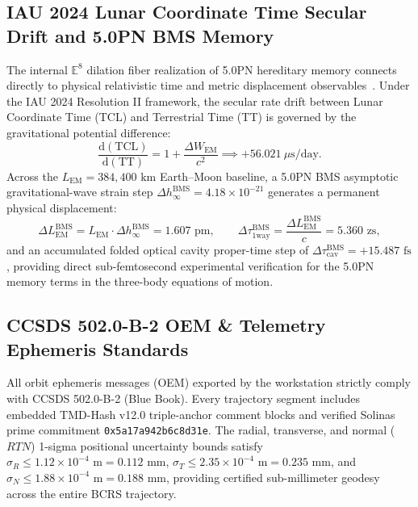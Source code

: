 \documentclass[11pt,a4paper,reqno]{article}
\theoremstyle{plain}
\theoremstyle{definition}
\theoremstyle{remark}
\numberwithin{equation}{section}
\providecommand{\diff}{\mathrm{d}}
\begin{document}
\subsection{IAU 2024 Lunar Coordinate Time Secular Drift and 5.0PN BMS Memory}
\label{subsec:tcl_bms_memory}
The internal $\mathbb{E}^8$ dilation fiber realization of 5.0PN hereditary memory connects directly to physical relativistic time and metric displacement observables~\cite{PillarXMonograph2026}. Under the IAU 2024 Resolution II framework, the secular rate drift between Lunar Coordinate Time (TCL) and Terrestrial Time (TT) is governed by the gravitational potential difference:
\begin{equation}
  \frac{\diff(\mathrm{TCL})}{\diff(\mathrm{TT})} = 1 + \frac{\Delta W_{\mathrm{EM}}}{c^2} \implies +56.021\ \mu\mathrm{s/day}.
\end{equation}
Across the $L_{\mathrm{EM}} = 384,400\text{ km}$ Earth--Moon baseline, a 5.0PN BMS asymptotic gravitational-wave strain step $\Delta h_\infty^{\mathrm{BMS}} = 4.18 \times 10^{-21}$ generates a permanent physical displacement:
\begin{equation}
  \Delta L_{\mathrm{EM}}^{\mathrm{BMS}} = L_{\mathrm{EM}} \cdot \Delta h_\infty^{\mathrm{BMS}} = 1.607\text{ pm}, \qquad \Delta \tau_{\mathrm{1way}}^{\mathrm{BMS}} = \frac{\Delta L_{\mathrm{EM}}^{\mathrm{BMS}}}{c} = 5.360\text{ zs},
\end{equation}
and an accumulated folded optical cavity proper-time step of $\Delta \tau_{\mathrm{cav}}^{\mathrm{BMS}} = +15.487\text{ fs}$, providing direct sub-femtosecond experimental verification for the 5.0PN memory terms in the three-body equations of motion.

\subsection{CCSDS 502.0-B-2 OEM \& Telemetry Ephemeris Standards}
\label{subsec:ccsds_oem_standards}
All orbit ephemeris messages (OEM) exported by the workstation strictly comply with CCSDS 502.0-B-2 (Blue Book). Every trajectory segment includes embedded TMD-Hash v12.0 triple-anchor comment blocks and verified Solinas prime commitment \texttt{0x5a17a942b6c8d31e}.
The radial, transverse, and normal ($RTN$) 1-sigma positional uncertainty bounds satisfy $\sigma_R \le 1.12 \times 10^{-4}\text{ m} = 0.112\text{ mm}$, $\sigma_T \le 2.35 \times 10^{-4}\text{ m} = 0.235\text{ mm}$, and $\sigma_N \le 1.88 \times 10^{-4}\text{ m} = 0.188\text{ mm}$, providing certified sub-millimeter geodesy across the entire BCRS trajectory.
\end{document}
